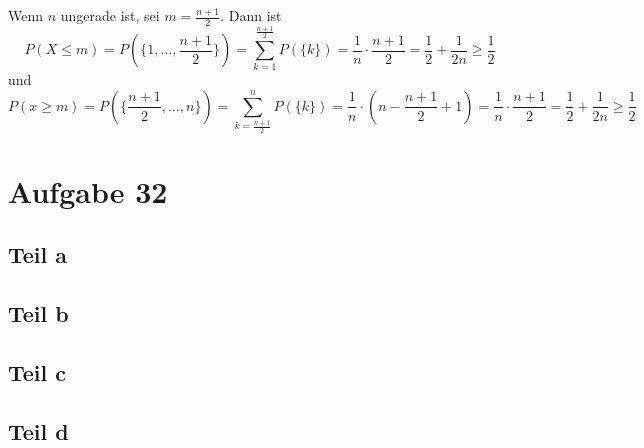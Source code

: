 \documentclass[10pt,a4paper]{article}
\begin{document}
Wenn $n$ ungerade ist, sei $m = \frac{n + 1}{2}$.
Dann ist
\begin{equation}
  P(X \le m) = P(\{ 1, \dots, \frac{n + 1}{2} \}) = \sum_{k = 1}^{\frac{n + 1}{2}} P(\{k\}) = \frac{1}{n} \cdot \frac{n + 1}{2} = \frac{1}{2} + \frac{1}{2n} \ge \frac{1}{2}
\end{equation}
und
\begin{equation}
  P(x \ge m) = P(\{ \frac{n + 1}{2}, \dots, n \}) = \sum_{k = \frac{n + 1}{2}}^{n} P(\{k\}) = \frac{1}{n} \cdot \left( n - \frac{n + 1}{2} + 1 \right) = \frac{1}{n} \cdot \frac{n + 1}{2} = \frac{1}{2} + \frac{1}{2n} \ge \frac{1}{2}
\end{equation}

\section{Aufgabe 32}

\subsection{Teil a}

\subsection{Teil b}

\subsection{Teil c}

\subsection{Teil d}
\end{document}
